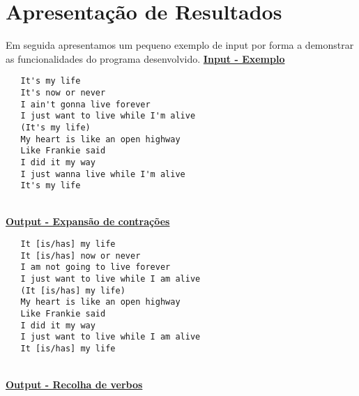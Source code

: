 \documentclass{report}
\begin{document}
\chapter{Apresentação de Resultados}
Em seguida apresentamos um pequeno exemplo de input por forma a demonstrar as funcionalidades do programa desenvolvido.
\textbf{\underline{Input - Exemplo}}
\begin{verbatim}
   It's my life
   It's now or never
   I ain't gonna live forever
   I just want to live while I'm alive
   (It's my life)
   My heart is like an open highway
   Like Frankie said
   I did it my way
   I just wanna live while I'm alive
   It's my life
\end{verbatim}
\\
\textbf{\underline{Output - Expansão de contrações}}
\begin{verbatim}
   It [is/has] my life
   It [is/has] now or never
   I am not going to live forever
   I just want to live while I am alive
   (It [is/has] my life)
   My heart is like an open highway
   Like Frankie said
   I did it my way
   I just want to live while I am alive
   It [is/has] my life
\end{verbatim}
\\
\textbf{\underline{Output - Recolha de verbos}}
\end{document}

